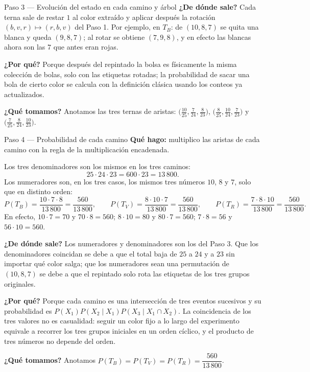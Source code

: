\documentclass[11pt]{article}
\begin{document}
\begin{paso}{Paso 3 --- Evolución del estado en cada camino y árbol}
\textbf{¿De dónde sale?} Cada terna sale de restar $1$ al color extraído y aplicar después la rotación $(b,v,r)\mapsto(r,b,v)$ del Paso 1. Por ejemplo, en $T_B$: de $(10,8,7)$ se quita una blanca y queda $(9,8,7)$; al rotar se obtiene $(7,9,8)$, y en efecto las blancas ahora son las $7$ que antes eran rojas.

\textbf{¿Por qué?} Porque después del repintado la bolsa es físicamente la misma colección de bolas, solo con las etiquetas rotadas; la probabilidad de sacar una bola de cierto color se calcula con la definición clásica usando los conteos ya actualizados.

\textbf{¿Qué tomamos?} Anotamos las tres ternas de aristas: $\bigl(\tfrac{10}{25},\tfrac{7}{24},\tfrac{8}{23}\bigr)$, $\bigl(\tfrac{8}{25},\tfrac{10}{24},\tfrac{7}{23}\bigr)$ y $\bigl(\tfrac{7}{25},\tfrac{8}{24},\tfrac{10}{23}\bigr)$.
\end{paso}

\begin{paso}{Paso 4 --- Probabilidad de cada camino}
\textbf{Qué hago:} multiplico las aristas de cada camino con la regla de la multiplicación encadenada.

Los tres denominadores son los mismos en los tres caminos:
\[
25\cdot 24\cdot 23=600\cdot 23=13\,800 .
\]
Los numeradores son, en los tres casos, los mismos tres números $10$, $8$ y $7$, solo que en distinto orden:
\[
P(T_B)=\frac{10\cdot 7\cdot 8}{13\,800}=\frac{560}{13\,800},
\qquad
P(T_V)=\frac{8\cdot 10\cdot 7}{13\,800}=\frac{560}{13\,800},
\qquad
P(T_R)=\frac{7\cdot 8\cdot 10}{13\,800}=\frac{560}{13\,800}.
\]
En efecto, $10\cdot 7=70$ y $70\cdot 8=560$; $8\cdot 10=80$ y $80\cdot 7=560$; $7\cdot 8=56$ y $56\cdot 10=560$.

\textbf{¿De dónde sale?} Los numeradores y denominadores son los del Paso 3. Que los denominadores coincidan se debe a que el total baja de $25$ a $24$ y a $23$ sin importar qué color salga; que los numeradores sean una permutación de $(10,8,7)$ se debe a que el repintado solo rota las etiquetas de los tres grupos originales.

\textbf{¿Por qué?} Porque cada camino es una intersección de tres eventos sucesivos y su probabilidad es $P(X_1)P(X_2\mid X_1)P(X_3\mid X_1\cap X_2)$. La coincidencia de los tres valores no es casualidad: seguir un color fijo a lo largo del experimento equivale a recorrer los tres grupos iniciales en un orden cíclico, y el producto de tres números no depende del orden.

\textbf{¿Qué tomamos?} Anotamos $P(T_B)=P(T_V)=P(T_R)=\dfrac{560}{13\,800}$.
\end{paso}
\end{document}
